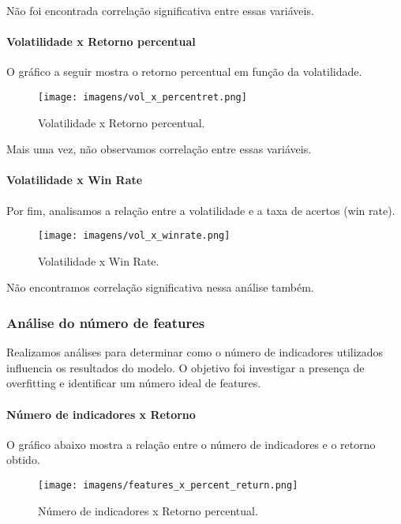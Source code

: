 \documentclass{article}
\begin{document}
Não foi encontrada correlação significativa entre essas variáveis.

\paragraph{Volatilidade x Retorno percentual}
O gráfico a seguir mostra o retorno percentual em função da volatilidade.

\begin{figure}[H]
    \centering
    \texttt{[image: imagens/vol\_x\_percentret.png]}
    \caption{Volatilidade x Retorno percentual.}
    \label{fig:volatilidade-retorno}
\end{figure}

Mais uma vez, não observamos correlação entre essas variáveis.

\paragraph{Volatilidade x Win Rate}
Por fim, analisamos a relação entre a volatilidade e a taxa de acertos (win rate).

\begin{figure}[H]
    \centering
    \texttt{[image: imagens/vol\_x\_winrate.png]}
    \caption{Volatilidade x Win Rate.}
    \label{fig:volatilidade-winrate}
\end{figure}

Não encontramos correlação significativa nessa análise também.

\subsubsection{Análise do número de features}
Realizamos análises para determinar como o número de indicadores utilizados influencia os resultados do modelo. O objetivo foi investigar a presença de overfitting e identificar um número ideal de features.

\paragraph{Número de indicadores x Retorno}
O gráfico abaixo mostra a relação entre o número de indicadores e o retorno obtido.

\begin{figure}[H]
    \centering
    \texttt{[image: imagens/features\_x\_percent\_return.png]}
    \caption{Número de indicadores x Retorno percentual.}
    \label{fig:features-retorno}
\end{figure}
\end{document}

